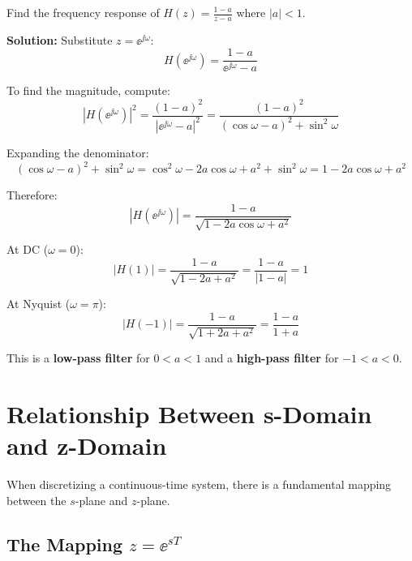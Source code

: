 \begin{examplebox}[title=Example: Frequency Response of a First-Order System]
Find the frequency response of $H(z) = \frac{1-a}{z-a}$ where $|a| < 1$.

\textbf{Solution:}
Substitute $z = \ee^{\jj\omega}$:
\begin{equation}
H(\ee^{\jj\omega}) = \frac{1-a}{\ee^{\jj\omega}-a}
\end{equation}

To find the magnitude, compute:
\begin{equation}
|H(\ee^{\jj\omega})|^2 = \frac{(1-a)^2}{|\ee^{\jj\omega}-a|^2} = \frac{(1-a)^2}{(\cos\omega - a)^2 + \sin^2\omega}
\end{equation}

Expanding the denominator:
\begin{equation}
(\cos\omega - a)^2 + \sin^2\omega = \cos^2\omega - 2a\cos\omega + a^2 + \sin^2\omega = 1 - 2a\cos\omega + a^2
\end{equation}

Therefore:
\begin{equation}
|H(\ee^{\jj\omega})| = \frac{1-a}{\sqrt{1 - 2a\cos\omega + a^2}}
\end{equation}

At DC ($\omega = 0$):
\begin{equation}
|H(1)| = \frac{1-a}{\sqrt{1-2a+a^2}} = \frac{1-a}{|1-a|} = 1
\end{equation}

At Nyquist ($\omega = \pi$):
\begin{equation}
|H(-1)| = \frac{1-a}{\sqrt{1+2a+a^2}} = \frac{1-a}{1+a}
\end{equation}

This is a \textbf{low-pass filter} for $0 < a < 1$ and a \textbf{high-pass filter} for $-1 < a < 0$.
\end{examplebox}

\section{Relationship Between s-Domain and z-Domain}

When discretizing a continuous-time system, there is a fundamental mapping between the $s$-plane and $z$-plane.

\subsection{\texorpdfstring{The Mapping $z = \ee^{sT}$}{The Mapping z = exp(sT)}}

